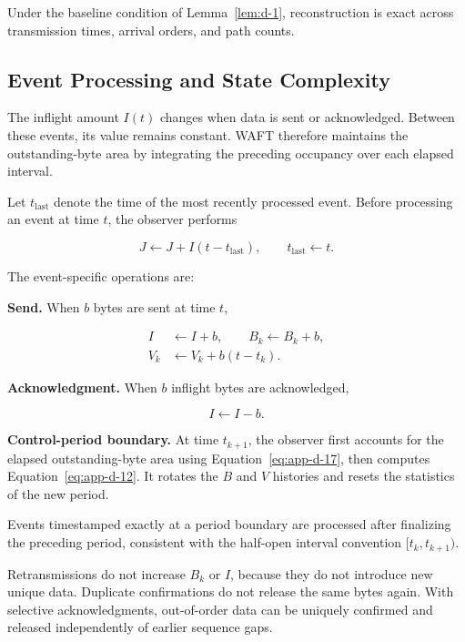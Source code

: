 Under the baseline condition of Lemma~\ref{lem:d-1}, reconstruction is exact across transmission times, arrival orders, and path counts.

\subsection{Event Processing and State Complexity}
\label{app:d-3}

The inflight amount \(I(t)\) changes when data is sent or acknowledged. Between these events, its value remains constant. WAFT therefore maintains the outstanding-byte area by integrating the preceding occupancy over each elapsed interval.

Let \(t_{\mathrm{last}}\) denote the time of the most recently processed event. Before processing an event at time \(t\), the observer performs

\begin{equation}
\label{eq:app-d-17}
J\leftarrow J+I(t-t_{\mathrm{last}}),
\qquad
t_{\mathrm{last}}\leftarrow t.
\end{equation}

The event-specific operations are:

\textbf{Send.} When \(b\) bytes are sent at time \(t\),

\begin{equation}
\label{eq:app-d-18}
\begin{aligned}
I&\leftarrow I+b,\qquad B_k\leftarrow B_k+b,\\
V_k&\leftarrow V_k+b(t-t_k).
\end{aligned}
\end{equation}

\textbf{Acknowledgment.} When \(b\) inflight bytes are acknowledged,

\begin{equation}
\label{eq:app-d-19}
I\leftarrow I-b.
\end{equation}

\textbf{Control-period boundary.} At time \(t_{k+1}\), the observer first accounts for the elapsed outstanding-byte area using Equation~\eqref{eq:app-d-17}, then computes Equation~\eqref{eq:app-d-12}. It rotates the \(B\) and \(V\) histories and resets the statistics of the new period.

Events timestamped exactly at a period boundary are processed after finalizing the preceding period, consistent with the half-open interval convention \([t_k,t_{k+1})\).

Retransmissions do not increase \(B_k\) or \(I\), because they do not introduce new unique data. Duplicate confirmations do not release the same bytes again. With selective acknowledgments, out-of-order data can be uniquely confirmed and released independently of earlier sequence gaps.

